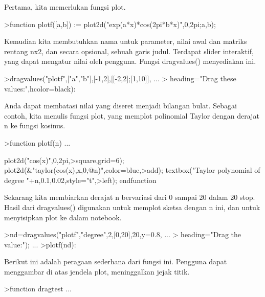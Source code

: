\documentclass{article}
\begin{document}
\begin{eulernotebook}
\begin{eulercomment}
\begin{eulercomment}
\begin{eulercomment}
\begin{eulercomment}
\begin{eulercomment}
\begin{eulercomment}
\begin{eulercomment}
Pertama, kita memerlukan fungsi plot.
\end{eulercomment}
\begin{eulerprompt}
>function plotf([a,b]) := plot2d("exp(a*x)*cos(2pi*b*x)",0,2pi;a,b);
\end{eulerprompt}
\begin{eulercomment}
Kemudian kita membutuhkan nama untuk parameter, nilai awal dan matriks
rentang nx2, dan secara opsional, sebuah garis judul. Terdapat slider
interaktif, yang dapat mengatur nilai oleh pengguna. Fungsi
dragvalues() menyediakan ini.
\end{eulercomment}
\begin{eulerprompt}
>dragvalues("plotf",["a","b"],[-1,2],[[-2,2];[1,10]], ...
>  heading="Drag these values:",hcolor=black):
\end{eulerprompt}
\begin{eulercomment}
Anda dapat membatasi nilai yang diseret menjadi bilangan bulat.
Sebagai contoh, kita menulis fungsi plot, yang memplot polinomial
Taylor dengan derajat n ke fungsi kosinus.
\end{eulercomment}
\begin{eulerprompt}
>function plotf(n) ...
\end{eulerprompt}
\begin{eulerudf}
  plot2d("cos(x)",0,2pi,>square,grid=6);
  plot2d(&"taylor(cos(x),x,0,@n)",color=blue,>add);
  textbox("Taylor polynomial of degree "+n,0.1,0.02,style="t",>left);
  endfunction
\end{eulerudf}
\begin{eulercomment}
Sekarang kita membiarkan derajat n bervariasi dari 0 sampai 20 dalam
20 stop. Hasil dari dragvalues() digunakan untuk memplot sketsa dengan
n ini, dan untuk menyisipkan plot ke dalam notebook.
\end{eulercomment}
\begin{eulerprompt}
>nd=dragvalues("plotf","degree",2,[0,20],20,y=0.8, ...
>   heading="Drag the value:"); ...
>plotf(nd):
\end{eulerprompt}
\begin{eulercomment}
Berikut ini adalah peragaan sederhana dari fungsi ini. Pengguna dapat
menggambar di atas jendela plot, meninggalkan jejak titik.
\end{eulercomment}
\begin{eulerprompt}
>function dragtest ...

\end{eulerprompt}
\end{eulercomment}
\end{eulercomment}
\end{eulercomment}
\end{eulercomment}
\end{eulercomment}
\end{eulercomment}
\end{eulernotebook}
\end{document}
